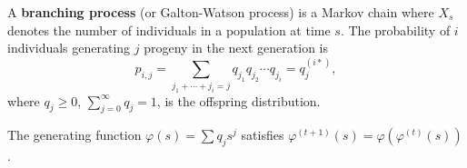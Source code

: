 A \textbf{branching process} (or Galton-Watson process) is a Markov chain where $X_s$ denotes the number of individuals in a population at time $s$. The probability of $i$ individuals generating $j$ progeny in the next generation is
$$p_{i,j} = \sum_{j_1+\cdots+j_i=j} q_{j_1} q_{j_2} \cdots q_{j_i} = q_j^{(i*)},$$
where $q_j \geq 0$, $\sum_{j=0}^{\infty} q_j = 1$, is the offspring distribution.

The generating function $\varphi(s) = \sum q_j s^j$ satisfies $\varphi^{(t+1)}(s) = \varphi(\varphi^{(t)}(s))$.
